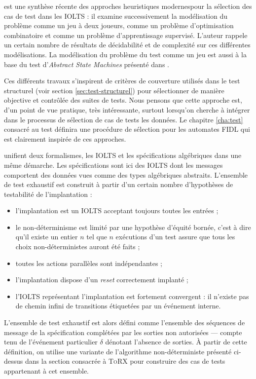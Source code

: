  \cite{yannakakis-test-opt-games} est une synth\`ese
r\'ecente des approches heuristiques \og modernes\fg pour la
s\'election des cas de test dans les \textsf{IOLTS} : il examine
successivement la mod\'elisation du probl\`eme comme un jeu \`a
deux joueurs, comme un probl\`eme d'optimisation combinatoire et
comme un probl\`eme d'apprentissage supervis\'e. L'auteur rappele un
certain nombre de r\'esultats de d\'ecidabilit\'e et de
complexit\'e sur ces diff\'erentes mod\'elisations. La
mod\'elisation du probl\`eme du test comme un jeu est aussi \`a la
base du test d'\emph{Abstract State Machines} pr\'esent\'e dans
\cite{blass-test-game}. 

Ces diff\'erents travaux s'inspirent de crit\`eres de couverture
utilis\'es dans le test structurel (voir section
\ref{sec:test-structurel})  pour s\'electionner  de mani\`ere
objective et contr\^ol\'ee des suites de tests. Nous pensons que
cette approche est, d'un point de vue pratique, tr\`es
int\'eressante, surtout lorsqu'on cherche \`a int\'egrer dans le
processus de s\'election de cas de tests les donn\'ees. Le chapitre
\ref{cha:test} consacr\'e au test d\'efinira une proc\'edure de s\'election pour les
automates \textsf{FIDL} qui est clairement inspir\'ee  de ces
approches.

\cite{testiodata,gaudel-unitheory} unifient deux formalismes, les \textsf{IOLTS}
et les sp\'ecifications alg\'ebriques dans une m\^eme
d\'emarche. Les sp\'ecifications sont ici des \textsf{IOLTS} 
dont les messages comportent des donn\'ees vues comme des types
alg\'ebriques abstraits. L'ensemble de test exhaustif est construit
\`a partir d'un certain nombre d'hypoth\`eses de testabilit\'e de
l'implantation :
\begin{itemize}
  \item l'implantation est un \textsf{IOLTS} acceptant toujours toutes les
  entr\'ees ;
\item le non-d\'eterminisme est limit\'e par une hypoth\`ese
  d'\'equit\'e born\'ee, c'est \`a dire qu'il existe un entier $n$ tel
  que $n$ ex\'ecutions d'un test assure que tous les choix
  non-d\'eterministes auront \'et\'e faits ;
\item toutes les actions parall\`eles sont ind\'ependantes ;
\item l'implantation dispose d'un \emph{reset} correctement
  implant\'e ;
\item l'\textsf{IOLTS} repr\'esentant l'implantation est fortement convergent :
  il n'existe pas de chemin infini de transitions \'etiquet\'ees par
  un \'ev\'enement interne.
\end{itemize}
L'ensemble de test exhaustif est alors d\'efini comme  l'ensemble des
s\'equences de message de  la sp\'ecification compl\'et\'ees par
 les sorties non autoris\'ees
--- compte tenu de l'\'ev\'enement particulier $\delta$ d\'enotant
l'absence de sorties.  \`A partir de cette d\'efinition, on utilise une
variante de l'algorithme non-d\'eterministe pr\'esent\'e ci-dessus dans la section
consacr\'ee \`a \textsc{ToRX} pour construire des cas de tests
appartenant \`a cet ensemble. 

